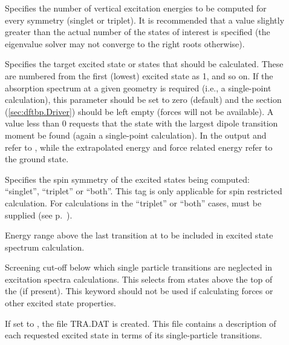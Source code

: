   \begin{description}

  \item[] Specifies the number of vertical excitation
    energies to be computed for every symmetry (singlet or triplet). It is
    recommended that a value slightly greater than the actual number of the
    states of interest is specified (the eigenvalue solver may not converge to
    the right roots otherwise).

  \item[] Specifies the target excited state or states that
    should be calculated. These are numbered from the first (lowest) excited
    state as 1, and so on. If the absorption spectrum at a given geometry is
    required (i.e., a single-point calculation), this parameter should be set to
    zero (default) and the  section (\ref{sec:dftbp.Driver}) should
    be left empty (forces will not be available). A value less than 0 requests
    that the state with the largest dipole transition moment be found (again a
    single-point calculation). In the output  and
     refer to , while
    the extrapolated energy and force related energy refer to the
    ground state.

  \item[] Specifies the spin symmetry of the excited states being
    computed: ``singlet'', ``triplet'' or ``both''. This tag is only applicable
    for spin restricted calculation. For calculations in the ``triplet'' or
    ``both'' cases,  must be supplied (see
    p.~).

  \item[] Energy range above the last
    transition at  to be included in excited state spectrum
    calculation.

  \item[] Screening cut-off
    below which single particle transitions are neglected in excitation spectra
    calculations. This selects from states above the top of the
     (if present). This keyword should not be used if
    calculating forces or other excited state properties.

  \item[] If set to , the file TRA.DAT is
    created. This file contains a description of each requested excited state in
    terms of its single-particle transitions.


\end{description}
